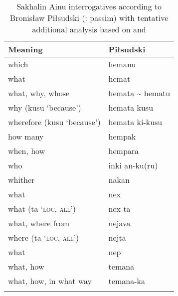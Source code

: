 \begin{table}[p]
\caption{Sakhalin Ainu interrogatives according to Bronisław Piłsudski (\citealt{Majewicz1998}: passim) with tentative additional analysis based on \citet{Shibatani1990} and \citet{Bugaeva2012}}
\label{tab:ainu:3}
\begin{tabularx}{.8\textwidth}{Xl}
\lsptoprule
\textbf{Meaning} & \textbf{Piłsudski}\\
\midrule
which & hemanu\\
what & hemat\\
what, why, whose & hemata {\textasciitilde} hematu\\
why (kusu ‘because’) & hemata kusu\\
wherefore (kusu ‘because’) & hemata ki-kusu\\
how many & hempak\\
when, how & hempara\\
who & inki an-ku(ru)\\
whither & nakan\\
what & nex\\
what (ta ‘\textsc{loc}, \textsc{all}’) & nex-ta\\
what, where from & nejava\\
where (ta ‘\textsc{loc}, \textsc{all}’) & nejta\\
what & nep\\
what, how & temana\\
what, how, in what way & temana-ka\\
\lspbottomrule
\end{tabularx}
\end{table}


